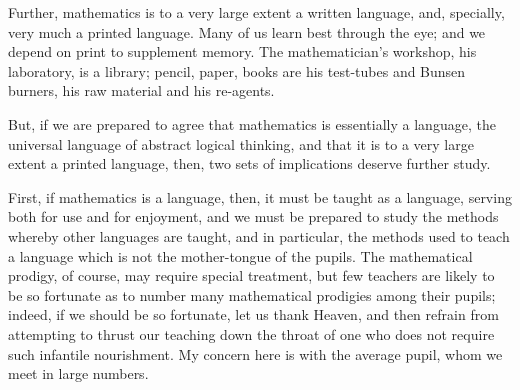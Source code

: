 Further, mathematics is to a very large extent a written language, and, specially, very much a printed language. Many of us learn best through the eye; and we depend on print to supplement memory. The mathematician's workshop, his laboratory, is a library; pencil, paper, books are his test-tubes and Bunsen burners, his raw material and his re-agents.

But, if we are prepared to agree that mathematics is essentially a language, the universal language of abstract logical thinking, and that it is to a very large extent a printed language, then, two sets of implications deserve further study.

First, if mathematics is a language, then, it must be taught as a language, serving both for use and for enjoyment, and we must be prepared to study the methods whereby other languages are taught, and in particular, the methods used to teach a language which is not the mother-tongue of the pupils. The mathematical prodigy, of course, may require special treatment, but few teachers are likely to be so fortunate as to number many mathematical prodigies among their pupils; indeed, if we should be so fortunate, let us thank Heaven, and then refrain from attempting to thrust our teaching down the throat of one who does not require such infantile nourishment. My concern here is with the average pupil, whom we meet in large numbers.


